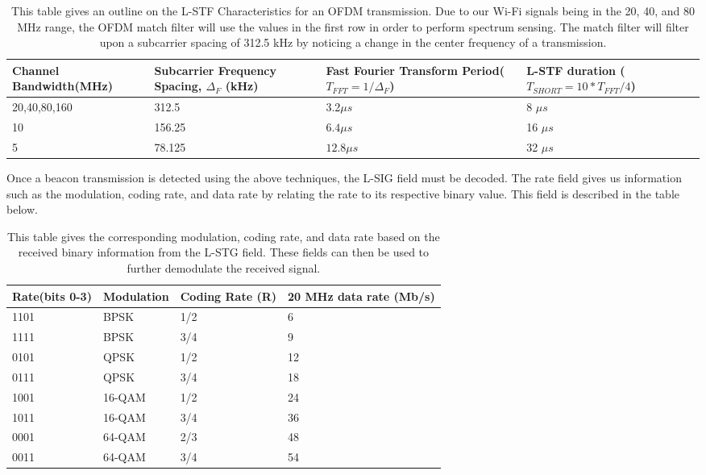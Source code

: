 \begin{table}[ht!]
	\centering
	\caption{This table gives an outline on the L-STF Characteristics for an OFDM transmission. Due to our Wi-Fi signals being in the 20, 40, and 80 MHz range, the OFDM match filter will use the values in the first row in order to perform spectrum sensing. The match filter will filter upon a subcarrier spacing of 312.5 kHz by noticing a change in the center frequency of a transmission.}	
\begin{tabular}{|p{3.6cm}|p{4cm}|p{4cm}|p{4.5cm}|}
	\hline
	Channel Bandwidth\newline(MHz) & Subcarrier Frequency Spacing, $\Delta_F$ (kHz) &Fast Fourier Transform Period\newline($T_{FFT}=1/\Delta_F$)& L-STF duration \newline($T_{SHORT}=10*T_{FFT}/4$) \\
	\hline
	20,40,80,160 & 312.5 &3.2$\mu s$ &8 $\mu s$ \\
	10 & 156.25 &$6.4\mu s$ &16 $\mu s $\\
	5 & 78.125 &$12.8\mu s$ &32 $\mu s$  \\
	\hline
\end{tabular} 

	\label{table:spacing}
\end{table} \par 
	
Once a beacon transmission is detected using the above techniques, the L-SIG field must be decoded. The rate field gives us information such as the modulation, coding rate, and data rate by relating the rate to its respective binary value. This field is described in the table below.
\begin{table}[ht!]
	\centering
		\caption{This table gives the corresponding modulation, coding rate, and data rate based on the received binary information from the L-STG field. These fields can then be used to further demodulate the received signal.}
	\begin{tabular}{|l|l|l|l|}
		\hline
		Rate(bits 0-3) & Modulation & Coding Rate (R) & 20 MHz data rate (Mb/s) \\
		\hline
		1101 & BPSK & 1/2 & 6 \\
		1111 & BPSK & 3/4 & 9 \\
		0101 & QPSK & 1/2 & 12 \\
		0111 & QPSK & 3/4 & 18 \\
		1001 & 16-QAM & 1/2 & 24 \\
		1011 & 16-QAM & 3/4 & 36 \\
		0001 & 64-QAM & 2/3 & 48 \\
		0011 & 64-QAM & 3/4 & 54 \\						
		\hline
	\end{tabular}
	\label{table:ofdm_rate_table}
\end{table} \par

